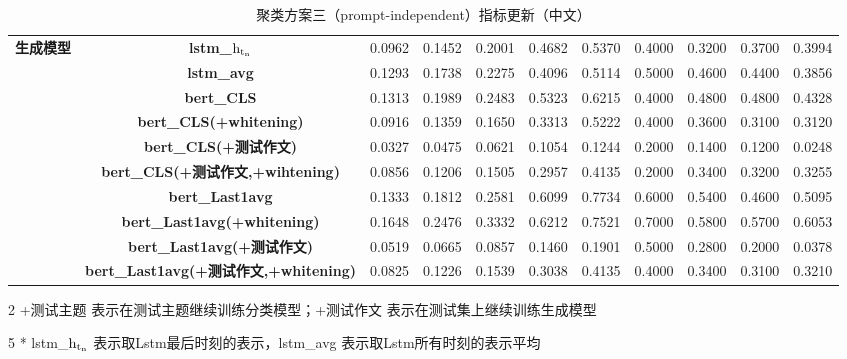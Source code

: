 \documentclass[11pt]{article}
\begin{document}
\begin{CJK}{UTF8}{gkai}
\begin{table}[htbp]
{\begin{tabular}{c|c|ccccccccc}
      \hline
      \multirow{10}[0]{*}{\textbf{生成模型}} & \textbf{lstm\_$\rm h_{t_n}$} & 0.0962  & 0.1452  & 0.2001  & 0.4682  & 0.5370  & 0.4000  & 0.3200  & 0.3700  & 0.3994  \\
      & \textbf{lstm\_avg} & 0.1293  & 0.1738  & 0.2275  & 0.4096  & 0.5114  & 0.5000  & 0.4600  & 0.4400  & 0.3856  \\
      \cline{2-11}
      & \textbf{bert\_CLS} & 0.1313  & 0.1989  & 0.2483  & 0.5323  & 0.6215  & 0.4000  & 0.4800  & 0.4800  & 0.4328  \\
      & \textbf{bert\_CLS(+whitening)} & 0.0916  & 0.1359  & 0.1650  & 0.3313  & 0.5222  & 0.4000  & 0.3600  & 0.3100  & 0.3120  \\
      & \textbf{bert\_CLS(+测试作文)} & 0.0327  & 0.0475  & 0.0621  & 0.1054  & 0.1244  & 0.2000  & 0.1400  & 0.1200  & 0.0248  \\
      & \textbf{bert\_CLS(+测试作文,+wihtening)} & 0.0856  & 0.1206  & 0.1505  & 0.2957  & 0.4135  & 0.2000  & 0.3400  & 0.3200  & 0.3255  \\
      \cline{2-11}
      & \textbf{bert\_Last1avg} & 0.1333  & 0.1812  & 0.2581  & 0.6099  & 0.7734  & 0.6000  & 0.5400  & 0.4600  & 0.5095  \\
      & \textbf{bert\_Last1avg(+whitening)} & 0.1648  & 0.2476  & 0.3332  & 0.6212  & 0.7521  & 0.7000  & 0.5800  & 0.5700  & 0.6053  \\
      & \textbf{bert\_Last1avg(+测试作文)} & 0.0519  & 0.0665  & 0.0857  & 0.1460  & 0.1901  & 0.5000  & 0.2800  & 0.2000  & 0.0378  \\
      & \textbf{bert\_Last1avg(+测试作文,+whitening)} & 0.0825  & 0.1226  & 0.1539  & 0.3038  & 0.4135  & 0.4000  & 0.3400  & 0.3100  & 0.3210  \\
      \hline
    \end{tabular}}%
    \begin{tablenotes}    %
      \footnotesize               %
      \item[2] +测试主题 表示在测试主题继续训练分类模型；+测试作文 表示在测试集上继续训练生成模型
      \item[5] * lstm\_$\rm h_{t_n}$ 表示取Lstm最后时刻的表示，lstm\_avg 表示取Lstm所有时刻的表示平均 
    \end{tablenotes} 
    \caption{聚类方案三（prompt-independent）指标更新（中文）}
  \label{tab:addlabel}%
\end{table}%



\end{CJK}
\end{document}
